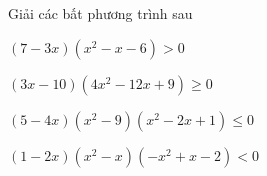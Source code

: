 \begin{bt}%
	Giải các bất phương trình sau 
	\begin{listEX}[1]
		\item $ (7-3 x)\left(x^{2}-x-6\right)>0 $
		\item $ (3 x-10)\left(4 x^{2}-12 x+9\right) \geq 0 $
		\item $ (5-4 x)\left(x^{2}-9\right)\left(x^{2}-2 x+1\right) \leq 0 $
		\item $ (1-2 x)\left(x^{2}-x\right)\left(-x^{2}+x-2\right)<0 $
	\end{listEX}
\end{bt}
